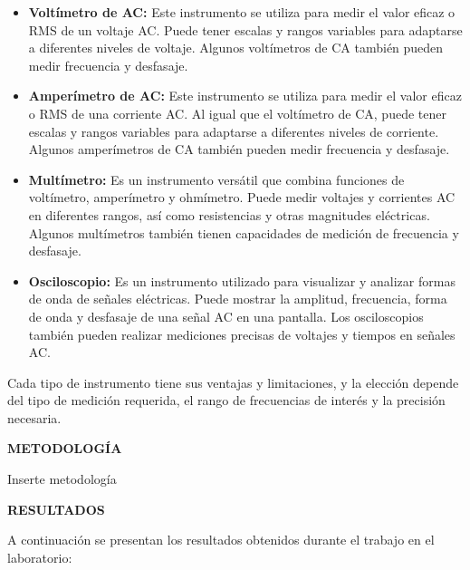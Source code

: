 \documentclass[12pt]{article}
\begin{document}
	\begin{itemize}
		\item \textbf{Voltímetro de AC:} Este instrumento se utiliza para medir el valor eficaz o RMS de un voltaje AC. Puede tener escalas y rangos variables para adaptarse a diferentes niveles de voltaje. Algunos voltímetros de CA también pueden medir frecuencia y desfasaje.
		
		\item \textbf{Amperímetro de AC:} Este instrumento se utiliza para medir el valor eficaz o RMS de una corriente AC. Al igual que el voltímetro de CA, puede tener escalas y rangos variables para adaptarse a diferentes niveles de corriente. Algunos amperímetros de CA también pueden medir frecuencia y desfasaje.
		
		\item \textbf{Multímetro:} Es un instrumento versátil que combina funciones de voltímetro, amperímetro y ohmímetro. Puede medir voltajes y corrientes AC en diferentes rangos, así como resistencias y otras magnitudes eléctricas. Algunos multímetros también tienen capacidades de medición de frecuencia y desfasaje.
		
		\item \textbf{Osciloscopio:} Es un instrumento utilizado para visualizar y analizar formas de onda de señales eléctricas. Puede mostrar la amplitud, frecuencia, forma de onda y desfasaje de una señal AC en una pantalla. Los osciloscopios también pueden realizar mediciones precisas de voltajes y tiempos en señales AC.
		
	\end{itemize}
	
	Cada tipo de instrumento tiene sus ventajas y limitaciones, y la elección depende del tipo de medición requerida, el rango de frecuencias de interés y la precisión necesaria.

	\newpage
	
	\begin{center}
		\textbf{\large METODOLOGÍA}\\
	\end{center}
	
	Inserte metodología
	
	\newpage
	
	\begin{center}
		\textbf{\large RESULTADOS}\\
	\end{center}
	
	A continuación se presentan los resultados obtenidos durante el trabajo en el laboratorio:
	
\end{document}
